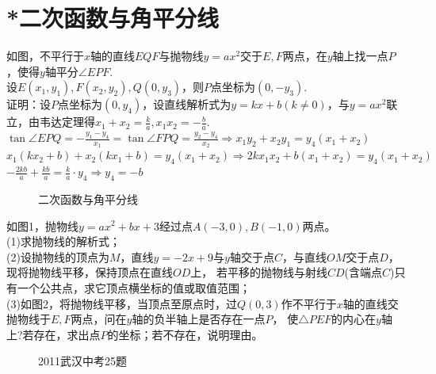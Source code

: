 \section{*二次函数与角平分线}
\begin{definition}
    如图，不平行于$x$轴的直线$EQF$与抛物线$y=ax^2$交于$E,F$两点，在$y$轴上找一点$P$，使得$y$轴平分$\angle EPF$. \\
    设$E(x_1,y_1),F(x_2,y_2),Q(0,y_3)$，则$P$点坐标为$(0,-y_3)$. \\
    证明：设$P$点坐标为$(0,y_4)$，设直线解析式为$y=kx+b(k\ne 0)$，与$y=ax^2$联立，由韦达定理得$x_1+x_2=\frac{k}{a},x_1x_2=-\frac{b}{a}$. \\
    $\tan \angle EPQ = -\frac{y_1-y_4}{x_1} = \tan \angle FPQ = \frac{y_2-y_4}{x_2} \Rightarrow x_1y_2+x_2y_1=y_4(x_1+x_2) $ \\
    $x_1(kx_2+b)+x_2(kx_1+b)=y_4(x_1+x_2) \Rightarrow 2kx_1x_2+b(x_1+x_2)=y_4(x_1+x_2)$ \\
    $-\frac{2kb}{a}+\frac{kb}{a}=\frac{k}{a}·y_4 \Rightarrow y_4=-b$
\end{definition}
\begin{figure}[H]
    \centering
    \resizebox{4cm}{!}{}
    \caption{二次函数与角平分线}
\end{figure}
\begin{problem}
如图1，抛物线$y=ax^2+bx+3$经过点$A(-3,0),B(-1,0)$两点。\\
(1)求抛物线的解析式；\\
(2)设抛物线的顶点为$M$，直线$y=-2x+9$与$y$轴交于点$C$，与直线$OM$交于点$D$，现将抛物线平移，保持顶点在直线$OD$上，
若平移的抛物线与射线$CD$(含端点$C$)只有一个公共点，求它顶点横坐标的值或取值范围；\\
(3)如图2，将抛物线平移，当顶点至原点时，过$Q(0,3)$作不平行于$x$轴的直线交抛物线于$E,F$两点，问在$y$轴的负半轴上是否存在一点$P$，
使$\triangle PEF$的内心在$y$轴上?若存在，求出点$P$的坐标；若不存在，说明理由。
\end{problem}
\begin{figure}[H]
    \centering
    \resizebox{8cm}{!}{}
    \caption{2011武汉中考25题}
\end{figure}
\clearpage

